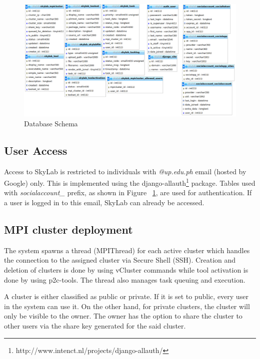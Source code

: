 	\begin{figure}[ht]
      \centering
      \includegraphics[scale=1.5]{./images/db_schema.png}
      \caption{\label{fig:dbschema}Database Schema}
    \end{figure}

\subsection{User Access}
Access to SkyLab is restricted to individuals with \textit{@up.edu.ph} email (hosted by Google) only. This is implemented  using the django-allauth\footnote{http://www.intenct.nl/projects/django-allauth/} package. Tables used with \textit{socialaccount\_} prefix, as shown in Figure ~\ref{fig:dbschema}, are used for authentication. If a user is logged in to this email, SkyLab can already be accessed.


\subsection{MPI cluster deployment} 

The system spawns a thread (MPIThread) for each active cluster which handles the connection to the assigned cluster via Secure Shell (SSH). Creation and deletion of clusters is done by using vCluster commands while tool activation is done by using p2c-tools. The thread also manages task queuing and execution.
		
A cluster is either classified as public or private. If it is set to public, every user in the system can use it. On the other hand, for private clusters, the cluster will only be visible to the owner. The owner has the option to share the cluster to other users via the share key generated for the said cluster. 		

